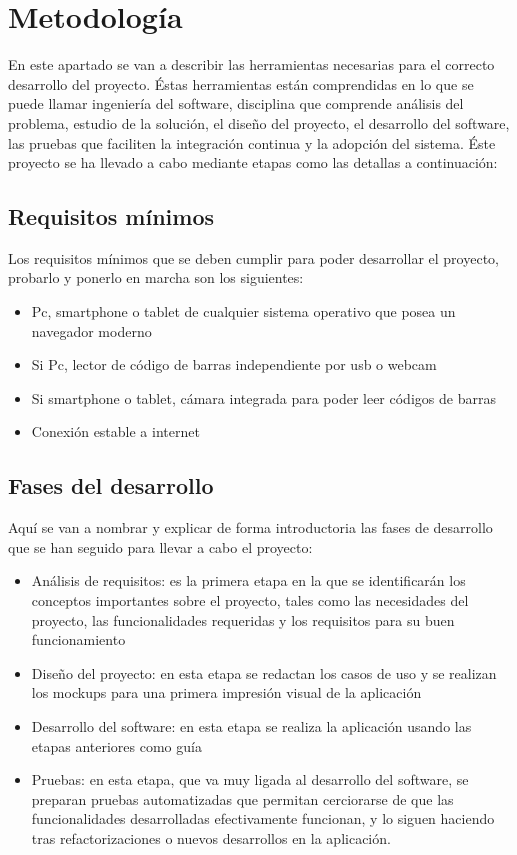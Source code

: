 
\chapter{Metodología}
\label{metodologia}
En este apartado se van a describir las herramientas necesarias para el correcto desarrollo del proyecto. Éstas herramientas están comprendidas en lo que se puede llamar ingeniería del software, disciplina que comprende análisis del problema, estudio de la solución, el diseño del proyecto, el desarrollo del software, las pruebas que faciliten la integración continua y la adopción del sistema. Éste proyecto se ha llevado a cabo mediante etapas como las detallas a continuación:
\section{Requisitos mínimos}
Los requisitos mínimos que se deben cumplir para poder desarrollar el proyecto, probarlo y ponerlo en marcha son los siguientes:
\begin{itemize}
    \item Pc, smartphone o tablet de cualquier sistema operativo que posea un navegador moderno
    \item Si Pc, lector de código de barras independiente por usb o webcam
    \item Si smartphone o tablet, cámara integrada para poder leer códigos de barras
    \item Conexión estable a internet
\end{itemize}
\section{Fases del desarrollo}
Aquí se van a nombrar y explicar de forma introductoria las fases de desarrollo que se han seguido para llevar a cabo el proyecto:
\begin{itemize}
    \item Análisis de requisitos: es la primera etapa en la que se identificarán los conceptos importantes sobre el proyecto, tales como las necesidades del proyecto, las funcionalidades requeridas y los requisitos para su buen funcionamiento
    \item Diseño del proyecto: en esta etapa se redactan los casos de uso y se realizan los mockups para una primera impresión visual de la aplicación
    \item Desarrollo del software: en esta etapa se realiza la aplicación usando las etapas anteriores como guía
    \item Pruebas: en esta etapa, que va muy ligada al desarrollo del software, se preparan pruebas automatizadas que permitan cerciorarse de que las funcionalidades desarrolladas efectivamente funcionan, y lo siguen haciendo tras refactorizaciones o nuevos desarrollos en la aplicación.
\end{itemize}
